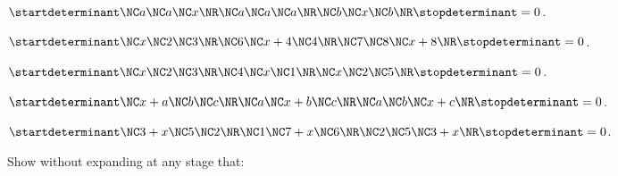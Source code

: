 \item $\startdeterminant\NC  a \NC a \NC x \NR\NC  a \NC a \NC a \NR\NC  b \NC x \NC b\NR\stopdeterminant = 0$.
\item $\startdeterminant\NC  x \NC 2 \NC 3\NR\NC 6 \NC x + 4 \NC 4\NR\NC 7 \NC 8 \NC x + 8\NR\stopdeterminant = 0$.
\item $\startdeterminant\NC  x \NC 2 \NC 3\NR\NC  4 \NC x \NC 1\NR\NC  x \NC 2 \NC 5\NR\stopdeterminant = 0$.
\item $\startdeterminant\NC  x + a \NC b \NC c\NR\NC  a \NC x + b \NC c\NR\NC  a \NC b \NC x + c\NR\stopdeterminant = 0$.
\item $\startdeterminant\NC  3 + x \NC 5 \NC 2 \NR\NC  1 \NC 7 + x \NC 6 \NR\NC  2 \NC 5 \NC 3 + x\NR\stopdeterminant = 0$.
\stopitemize

Show without expanding at any stage that:

